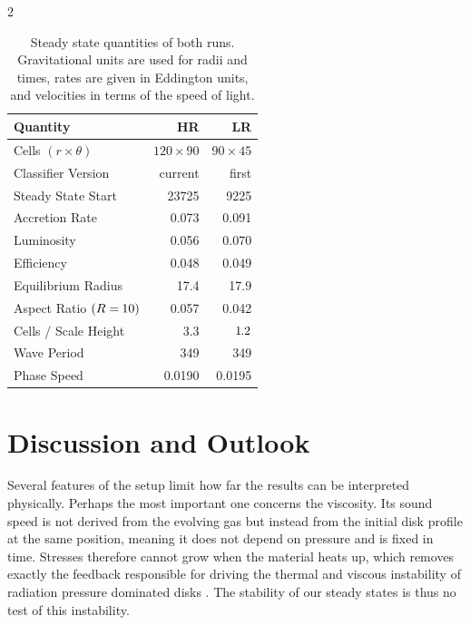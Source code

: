 \begin{multicols}{2}
	\begin{table}[H]
		\centering
		\caption{Steady state quantities of both runs. Gravitational units are used for radii and times, rates
		are given in Eddington units, and velocities in terms of the speed of light.}
		\begin{tabular}{l r r}
			\toprule
			Quantity & HR & LR \\
			\midrule
			Cells $(r \times \theta)$ & $120 \times 90$ & $90 \times 45$ \\
			Classifier Version        & current         & first \\
			Steady State Start        & \num{23725}     & \num{9225} \\
			Accretion Rate            & \num{0.073}     & \num{0.091} \\
			Luminosity                & \num{0.056}     & \num{0.070} \\
			Efficiency                & \num{0.048}     & \num{0.049} \\
			Equilibrium Radius        & \num{17.4}      & \num{17.9} \\
			Aspect Ratio $(R =\kern-0.5pt 10)$   & \num{0.057}     & \num{0.042} \\
			Cells / Scale Height      & \num{3.3}       & $1{\kern-0.5pt}.2$ \\
			Wave Period               & \num{349}       & \num{349} \\
			Phase Speed               & \num{0.0190}    & \num{0.0195} \\
			\bottomrule
		\end{tabular}
		\label{tab:runs}
	\end{table}

	\section{Discussion and Outlook}
	\label{sec:discussion}

	Several features of the setup limit how far the results can be interpreted physically. Perhaps the most important one concerns the
	viscosity. Its sound speed is not derived from the evolving gas but instead from the initial disk profile at the same position, meaning it
	does not depend on pressure and is fixed in time. Stresses therefore cannot grow when the material heats up, which removes exactly
	the feedback responsible for driving the thermal and viscous instability of radiation pressure dominated disks \cite{ligh1974, shak1976}. The stability
	of our steady states is thus no test of this instability.


\end{multicols}
